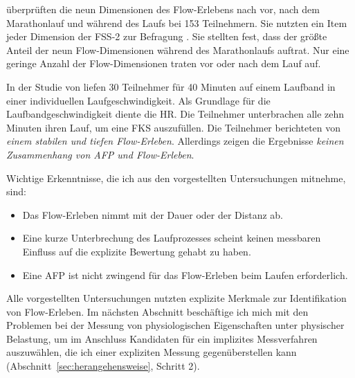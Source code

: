 \citet{Jimenez-Torres2013} überprüften die neun Dimensionen des Flow-Erlebens nach \citet{Csikszentmihalyi1992} vor, nach dem Marathonlauf und während des Laufs bei 153 Teilnehmern. Sie nutzten ein Item jeder Dimension der \ac{FSS}-2 zur Befragung \citep{Jackson2002}. Sie stellten fest, dass der größte Anteil der neun Flow-Dimensionen während des Marathonlaufs auftrat. Nur eine geringe Anzahl der Flow-Dimensionen traten vor oder nach dem Lauf auf. 

In der Studie von \citet{Reinhardt2006} liefen 30 Teilnehmer für 40 Minuten auf einem Laufband in einer individuellen Laufgeschwindigkeit. Als Grundlage für die Laufbandgeschwindigkeit diente die \ac{HR}. Die Teilnehmer unterbrachen alle zehn Minuten ihren Lauf, um eine \ac{FKS} auszufüllen. Die Teilnehmer berichteten von \emph{einem stabilen und tiefen Flow-Erleben}. Allerdings zeigen die Ergebnisse \emph{keinen Zusammenhang von \ac{AFP} und Flow-Erleben}.

Wichtige Erkenntnisse, die ich aus den vorgestellten Untersuchungen mitnehme, sind: 
\begin{itemize}
	
	\item Das Flow-Erleben nimmt mit der Dauer oder der Distanz ab.
	
	\item Eine kurze Unterbrechung des Laufprozesses scheint keinen messbaren Einfluss auf die explizite Bewertung gehabt zu haben.
	
	\item Eine \ac{AFP} ist nicht zwingend für das Flow-Erleben beim Laufen erforderlich. 
\end{itemize}

Alle vorgestellten Untersuchungen nutzten explizite Merkmale zur Identifikation von Flow-Erleben. Im nächsten Abschnitt beschäftige ich mich mit den Problemen bei der Messung von physiologischen Eigenschaften unter physischer Belastung, um im Anschluss Kandidaten für ein implizites Messverfahren auszuwählen, die ich einer expliziten Messung gegenüberstellen kann (Abschnitt~\ref{sec:herangehensweise}, Schritt 2). 

